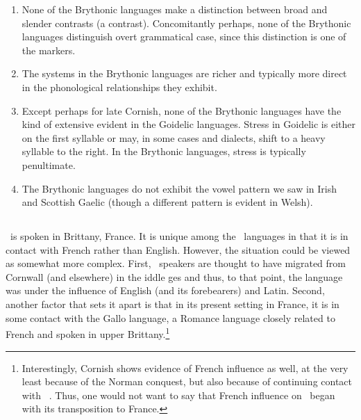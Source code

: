 \documentclass[output=paper,colorlinks,citecolor=brown]{langscibook}
\begin{document}
\begin{enumerate}

\item None of the Brythonic languages make a distinction between broad and slender contrasts (a  contrast). Concomitantly perhaps, none of the Brythonic languages distinguish overt grammatical case, since this distinction is one of the markers.

\item The \m{} systems in the Brythonic languages are richer and typically more direct in the phonological relationships they exhibit.

\item Except perhaps for late Cornish, none of the Brythonic languages have the kind of extensive  evident in the Goidelic languages. Stress in Goidelic is either on the first syllable or may, in some cases and dialects, shift to a heavy syllable to the right. In the Brythonic languages, stress is typically penultimate.

\item The Brythonic languages do not exhibit the vowel  pattern we saw in Irish and Scottish Gaelic (though a different  pattern is evident in Welsh).

\end{enumerate}


\subsection{\br}

\br\ is spoken in Brittany, France. It is unique among the \ce\ languages in that it is in contact with French rather than English. However, the situation could be viewed as somewhat more complex. First, \br\ speakers are thought to have migrated from Cornwall (and elsewhere) in the iddle ges and thus, to that point, the language was under the influence of English (and its forebearers) and Latin. Second, another factor that sets it apart is that in its present setting in France, it is in some contact with the Gallo language, a Romance language closely related to French and spoken in upper Brittany.\footnote{Interestingly, Cornish shows evidence of French influence as well, at the very least because of the Norman conquest, but also because of continuing contact with \br\ \citep{cornish.history}. Thus, one would not want to say that French influence on \br\ began with its transposition to France.}
\end{document}
